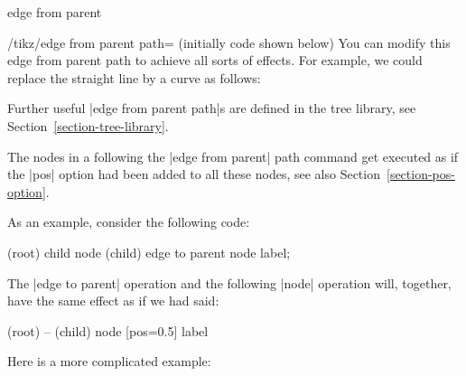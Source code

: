 \begin{pathoperation}{edge from parent}{}
\begin{enumerate}
\begin{key}{/tikz/edge from parent path= (initially \normalfont code shown below)}
                You can modify this edge from parent path to achieve all sorts
                of effects. For example, we could replace the straight line by
                a curve as follows:
\begin{codeexample}[]
\end{codeexample}

                Further useful |edge from parent path|s are defined in the tree
                library, see Section~\ref{section-tree-library}.

                The nodes in a  following the
                |edge from parent| path command get executed as if the |pos|
                option had been added to all these nodes, see also
                Section~\ref{section-pos-option}.

                As an example, consider the following code:
\begin{codeexample}
\node (root) {} child {node (child) {} edge to parent node {label}};
\end{codeexample}
                The |edge to parent| operation and the following |node|
                operation will, together, have the same effect as if we had
                said:
\begin{codeexample}
(root) -- (child) node [pos=0.5] {label}
\end{codeexample}

                Here is a more complicated example:
\begin{codeexample}[]
\end{codeexample}


\end{key}
\end{enumerate}
\end{pathoperation}
